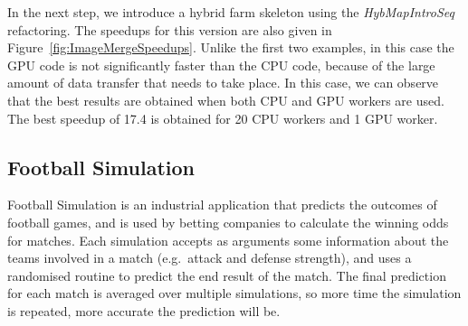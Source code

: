 \documentclass[final]{jfp1}
\begin{document}

%
In the next step, we introduce a hybrid farm skeleton using
the \emph{HybMapIntroSeq} refactoring.
The speedups for this version are also given in
Figure~\ref{fig:ImageMergeSpeedups}. Unlike the first two
examples, in this case the GPU code is not significantly faster than the CPU
code, because of the large amount of data transfer that needs to take
place. In this case, we can observe that the
best results are obtained when both CPU and GPU workers are used.
The best speedup of 17.4 is obtained for 20 CPU workers and 1 GPU worker.

\subsection{Football Simulation}
Football Simulation is an industrial application that predicts the 
outcomes of football games, and is used by betting companies to calculate the winning odds
for matches. Each simulation accepts as arguments some information about the teams involved
in a match (e.g.\ attack and defense strength), and uses a randomised routine to predict
the end result of the match. The final prediction for each match
is averaged over multiple simulations,
so more time the simulation is repeated, more accurate the prediction will be.
\end{document}
